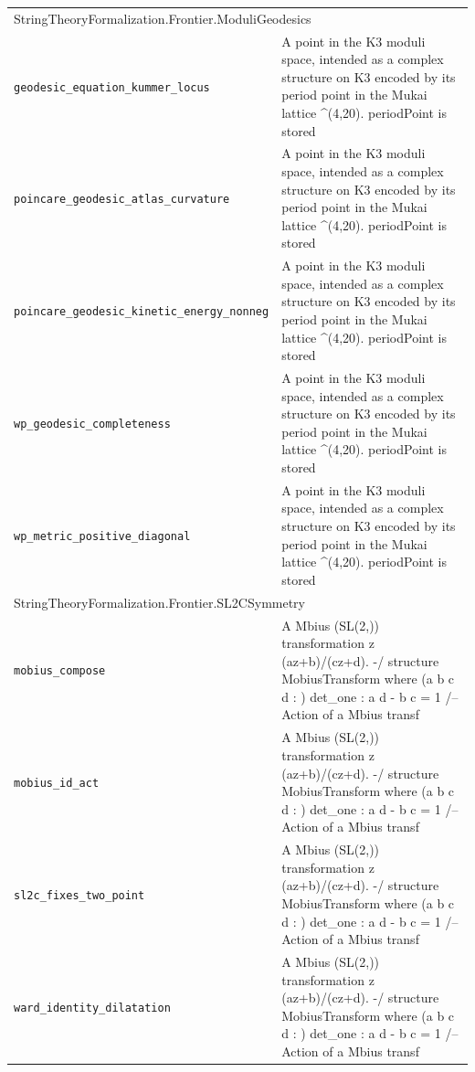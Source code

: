 \begin{longtable}{p{}p{}}
\multicolumn{2}{l}{\textsf{\small StringTheoryFormalization.Frontier.ModuliGeodesics}} \\
\quad\texttt{\footnotesize geodesic\_equation\_kummer\_locus} & {\footnotesize A point in the K3 moduli space, intended as a complex structure on K3 encoded by its period point in the Mukai lattice \^{}(4,20). periodPoint is stored } \\
\quad\texttt{\footnotesize poincare\_geodesic\_atlas\_curvature} & {\footnotesize A point in the K3 moduli space, intended as a complex structure on K3 encoded by its period point in the Mukai lattice \^{}(4,20). periodPoint is stored } \\
\quad\texttt{\footnotesize poincare\_geodesic\_kinetic\_energy\_nonneg} & {\footnotesize A point in the K3 moduli space, intended as a complex structure on K3 encoded by its period point in the Mukai lattice \^{}(4,20). periodPoint is stored } \\
\quad\texttt{\footnotesize wp\_geodesic\_completeness} & {\footnotesize A point in the K3 moduli space, intended as a complex structure on K3 encoded by its period point in the Mukai lattice \^{}(4,20). periodPoint is stored } \\
\quad\texttt{\footnotesize wp\_metric\_positive\_diagonal} & {\footnotesize A point in the K3 moduli space, intended as a complex structure on K3 encoded by its period point in the Mukai lattice \^{}(4,20). periodPoint is stored } \\
\multicolumn{2}{l}{\textsf{\small StringTheoryFormalization.Frontier.SL2CSymmetry}} \\
\quad\texttt{\footnotesize mobius\_compose} & {\footnotesize A Mbius (SL(2,)) transformation z  (az+b)/(cz+d). -/ structure MobiusTransform where (a b c d : ) det\_one : a d - b c = 1 /-- Action of a Mbius transf} \\
\quad\texttt{\footnotesize mobius\_id\_act} & {\footnotesize A Mbius (SL(2,)) transformation z  (az+b)/(cz+d). -/ structure MobiusTransform where (a b c d : ) det\_one : a d - b c = 1 /-- Action of a Mbius transf} \\
\quad\texttt{\footnotesize sl2c\_fixes\_two\_point} & {\footnotesize A Mbius (SL(2,)) transformation z  (az+b)/(cz+d). -/ structure MobiusTransform where (a b c d : ) det\_one : a d - b c = 1 /-- Action of a Mbius transf} \\
\quad\texttt{\footnotesize ward\_identity\_dilatation} & {\footnotesize A Mbius (SL(2,)) transformation z  (az+b)/(cz+d). -/ structure MobiusTransform where (a b c d : ) det\_one : a d - b c = 1 /-- Action of a Mbius transf} \\

\end{longtable}

